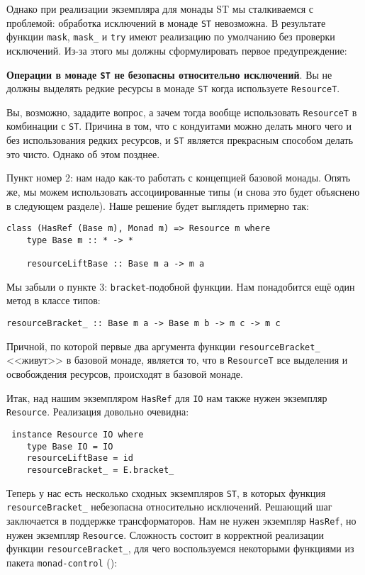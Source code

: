 Однако при реализации экземпляра для монады ST мы сталкиваемся с проблемой:
обработка исключений в
монаде \lstinline{ST} невозможна. В результате функции \lstinline'mask',
\lstinline'mask_' и \lstinline'try' имеют
реализацию по умолчанию без проверки исключений. Из-за этого мы должны сформулировать первое
предупреждение:

\textbf{Операции в монаде \lstinline{ST} не безопасны относительно исключений}. Вы не должны выделять
редкие ресурсы в монаде \lstinline{ST} когда используете \lstinline'ResourceT'.

Вы, возможно, зададите вопрос, а зачем тогда вообще использовать \lstinline'ResourceT' в комбинации с \lstinline'ST'. Причина в том, что с кондуитами можно делать много чего и без использования редких ресурсов, и \lstinline'ST' является прекрасным способом делать это чисто. Однако об этом позднее.

Пункт номер 2: нам надо как-то работать с концепцией базовой монады. Опять же, мы можем
использовать ассоциированные типы (и снова это будет объяснено в следующем разделе).
Наше решение будет выглядеть примерно так:
\begin{lstlisting}
class (HasRef (Base m), Monad m) => Resource m where
    type Base m :: * -> *

    resourceLiftBase :: Base m a -> m a
\end{lstlisting}

Мы забыли о пункте 3: \lstinline'bracket'-подобной функции. Нам понадобится ещё один метод в классе
типов:
\begin{lstlisting}
resourceBracket_ :: Base m a -> Base m b -> m c -> m c
\end{lstlisting}
Причной, по которой первые два аргумента функции \lstinline'resourceBracket_' <<живут>> в
базовой монаде, является то, что в \lstinline'ResourceT' все выделения и освобождения
ресурсов, происходят в базовой монаде.

Итак, над нашим экземпляром \lstinline'HasRef' для \lstinline'IO' нам также нужен экземпляр
\lstinline'Resource'. Реализация довольно очевидна:
\begin{lstlisting}
 instance Resource IO where
    type Base IO = IO
    resourceLiftBase = id
    resourceBracket_ = E.bracket_
\end{lstlisting}

Теперь у нас есть несколько сходных экземпляров \lstinline'ST', в которых функция
\lstinline'resourceBracket_' небезопасна относительно исключений. Решающий шаг заключается
в поддержке трансформаторов. Нам не нужен
экземпляр \lstinline'HasRef', но нужен экземпляр \lstinline'Resource'.
Сложность состоит в корректной реализации функции \lstinline'resourceBracket_', для чего
воспользуемся некоторыми функциями из пакета \texttt{monad-control}
():

